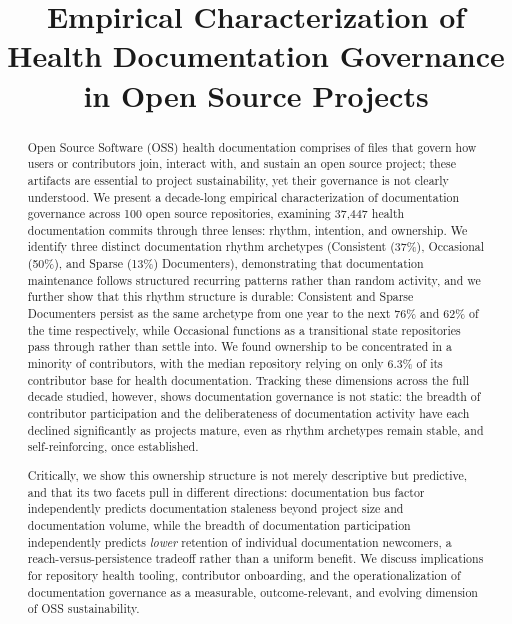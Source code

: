 \documentclass[10pt,conference]{IEEEtran}
\begin{document}
\title{Empirical Characterization of Health Documentation Governance in Open Source Projects}



\maketitle

\begin{abstract}
Open Source Software (OSS) health documentation comprises of files that govern how users or contributors join, interact with, and sustain an open source project; these artifacts are essential to project sustainability, yet their governance is not clearly understood.
We present a decade-long empirical characterization of documentation governance across 100 open source repositories, examining 37,447 health documentation commits through three lenses: rhythm, intention, and ownership.
We identify three distinct documentation rhythm archetypes (Consistent (37\%), Occasional (50\%), and Sparse (13\%)
Documenters), demonstrating that documentation maintenance
follows structured recurring patterns rather than random activity, and we further show that this rhythm structure is durable: Consistent and Sparse Documenters persist as the same archetype from one year to the next 76\% and 62\% of the time respectively, while Occasional functions as a transitional state repositories pass through rather than settle into.
We found ownership to be concentrated in a minority of contributors, with the median repository relying on only 6.3\% of its contributor base for health documentation.
Tracking these dimensions across the full decade studied, however, shows documentation governance is not static: the breadth of contributor participation and the deliberateness of documentation activity have each declined significantly as projects mature, even as rhythm archetypes remain stable, and self-reinforcing, once established.

Critically, we show this ownership structure is not merely descriptive but predictive, and that its two facets pull in different directions: documentation bus factor independently predicts documentation staleness beyond project size and documentation volume, while the breadth of documentation participation independently predicts \textit{lower} retention of individual documentation newcomers, a reach-versus-persistence tradeoff rather than a uniform benefit.
We discuss implications for repository health tooling, contributor onboarding, and the operationalization of documentation governance as a measurable, outcome-relevant, and evolving dimension of OSS sustainability.
\end{abstract}
\end{document}
